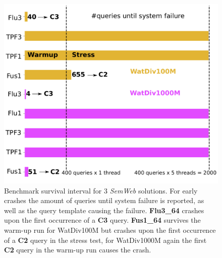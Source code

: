 %
%
%
%

\begin{figure}[htbp!]
\centering
\includegraphics[width=0.99\linewidth]{imgs/Fig03_BenchmarkSurvival_Other_Watdiv_Default}
\caption{Benchmark survival interval for 3 \emph{SemWeb} solutions. For early crashes the amount of queries until system failure is reported, as well as the query template causing the failure. \textbf{Flu3\_64} crashes upon the first occurrence of a \textbf{C3} query. \textbf{Fus1\_64} survives the warm-up run for WatDiv100M but crashes upon the first occurrence of a \textbf{C2} query in the stress test, for WatDiv1000M again the first \textbf{C2} query in the warm-up run causes the crash.}
\label{fig:Fig03_BenchmarkSurvival_Other_Watdiv_Default}
\end{figure}

